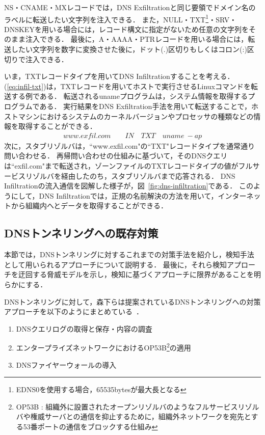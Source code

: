 
NS・CNAME・MXレコードでは，DNS Exfiltrationと同じ要領でドメイン名のラベルに転送したい文字列を注入できる．
また，NULL・TXT\footnote{EDNS0を使用する場合，65535bytesが最大長となる}・SRV・DNSKEYを用いる場合には，レコード構文に指定がないため任意の文字列をそのまま注入できる．
最後に，A・AAAA・PTRレコードを用いる場合には，転送したい文字列を数字に変換させた後に，ドット(.)区切りもしくはコロン(:)区切りで注入できる．

いま，TXTレコードタイプを用いてDNS Infiltrationすることを考える．
(\ref{eq:infil-txt})は，TXTレコードを用いてホストで実行させるLinuxコマンドを転送する例である．
転送されるunameプログラムは，システム情報を取得するプログラムである．
実行結果をDNS Exfiltration手法を用いて転送することで，ホストマシンにおけるシステムのカーネルバージョンやプロセッサの種類などの情報を取得することができる．
\begin{eqnarray}
 www.exfil.com \qquad IN \quad TXT \quad uname \ -ap
 \label{eq:infil-txt}
\end{eqnarray}
次に，スタブリゾルバは，``www.exfil.com"の``TXT"レコードタイプを通常通り問い合わせる．
再帰問い合わせの仕組みに基づいて，そのDNSクエリは``exfil.com"まで転送され，ゾーンファイルのTXTレコードタイプの値がフルサービスリゾルバを経由したのち，スタブリゾルバまで応答される．
DNS Infiltrationの流入通信を図解した様子が，図~\ref{fig:dns-infiltration}である．
このようにして，DNS Infiltrationでは，正規の名前解決の方法を用いて，インターネットから組織内へとデータを取得することができる．


\newpage
\subsection{DNSトンネリングへの既存対策}

本節では，DNSトンネリングに対するこれまでの対策手法を紹介し，検知手法として用いられるアプローチについて説明する．
最後に，それら検知アプローチを迂回する脅威モデルを示し，検知に基づくアプローチに限界があることを明らかにする．

DNSトンネリングに対して，森下らは提案されているDNSトンネリングへの対策アプローチを以下のようにまとめている~\cite{morishita}．
\begin{enumerate}
 \item DNSクエリログの取得と保存・内容の調査
 \item エンタープライズネットワークにおけるOP53B\footnote{OP53B : 組織外に設置されたオープンリゾルバのようなフルサービスリゾルバや権威サーバとの通信を抑止するために，組織外ネットワークを宛先とする53番ポートの通信をブロックする仕組み}の適用
 \item DNSファイヤーウォールの導入
\end{enumerate}

